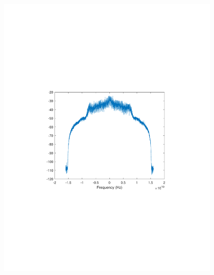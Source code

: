 \begin{refsection}
\begin{figure}[H]
	\centering
	\begin{minipage}{0.30\textwidth}
		\centering
		\includegraphics[clip, trim=4cm 8cm 4cm 8cm, width=1\textwidth]{./sdf/m_qam_system/figures/expResults/homodyne/2_16GBdInSig13dB_AfMF.pdf}
		\label{fig:16GBdEyeMf}
	\end{minipage}
	\begin{minipage}{0.30\textwidth}
		\centering

\end{minipage}
\end{figure}
\end{refsection}
